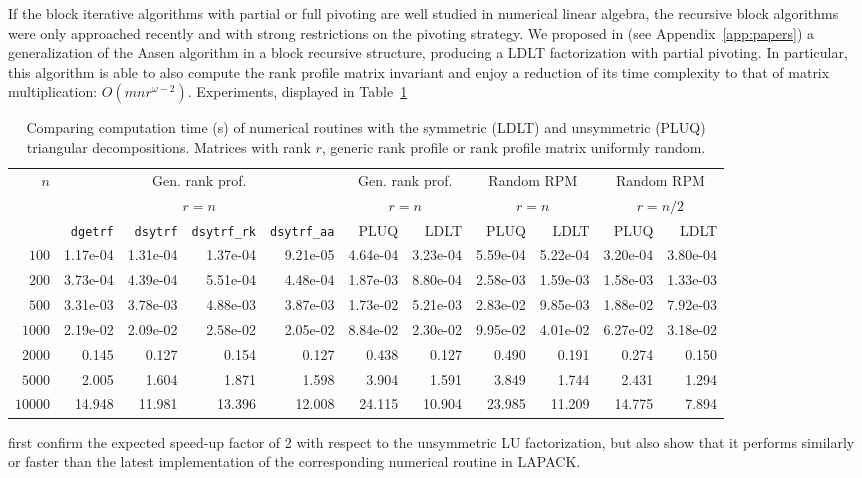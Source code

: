 \documentclass{deliverablereport}
\begin{document}
If the block iterative algorithms with partial or full pivoting are well studied
in numerical linear algebra, the recursive block algorithms were only
approached recently and with strong restrictions on the pivoting strategy.
We proposed in \cite{DuPe18} (see Appendix~\ref{app:papers}) a generalization of the Aasen algorithm in a block
recursive structure, producing a LDLT factorization with partial pivoting. In
particular, this algorithm is able to also compute the rank profile matrix
invariant and enjoy a reduction of its time complexity to that of matrix
multiplication: $O(mnr^{\omega-2})$. Experiments, displayed in
Table~\ref{tab:ldlt}
%
\begin{table}[htb]\centering
  \footnotesize
    \begin{tabular}{rrrrrrrrrrr}
  \toprule
  \multirow{3}{*}{$n$} & 
  \multicolumn{4}{c}{Gen. rank prof.} & \multicolumn{2}{c}{Gen. rank prof.} &
  \multicolumn{2}{c}{Random RPM} & \multicolumn{2}{c}{Random RPM}\\
  &\multicolumn{4}{c}{ $r=n$}&\multicolumn{2}{c}{ $r=n$}&
  \multicolumn{2}{c}{ $r=n$}&\multicolumn{2}{c}{ $r=n/2$}\\
  & \texttt{dgetrf} & \texttt{dsytrf} & \texttt{dsytrf\_rk} & \texttt{dsytrf\_aa} & PLUQ & LDLT & PLUQ& LDLT & PLUQ & LDLT\\
  \midrule
$100$   & 1.17e-04 & 1.31e-04 & 1.37e-04 & 9.21e-05 & 4.64e-04 & 3.23e-04 & 5.59e-04 & 5.22e-04 & 3.20e-04 & 3.80e-04\\
$200$   & 3.73e-04 & 4.39e-04 & 5.51e-04 & 4.48e-04 & 1.87e-03 & 8.80e-04 & 2.58e-03 & 1.59e-03 & 1.58e-03 & 1.33e-03\\
$500$   & 3.31e-03 & 3.78e-03 & 4.88e-03 & 3.87e-03 & 1.73e-02 & 5.21e-03 & 2.83e-02 & 9.85e-03 & 1.88e-02 & 7.92e-03\\
$1000$  & 2.19e-02 & 2.09e-02 & 2.58e-02 & 2.05e-02 & 8.84e-02 & 2.30e-02 & 9.95e-02 & 4.01e-02 & 6.27e-02 & 3.18e-02\\
$2000$  & 0.145 & 0.127 & 0.154 & 0.127 & 0.438 & 0.127 & 0.490 & 0.191 & 0.274 & 0.150\\
$5000$  & 2.005 & 1.604 & 1.871 & 1.598 & 3.904 & 1.591 & 3.849 & 1.744 & 2.431 & 1.294\\
$10000$ & 14.948 & 11.981 & 13.396 & 12.008 & 24.115 & 10.904 & 23.985 & 11.209 & 14.775 & 7.894\\
  \bottomrule 
  \end{tabular}
  \caption{Comparing computation time (s) of numerical routines with the
    symmetric (LDLT) and unsymmetric (PLUQ) triangular decompositions. Matrices
    with rank $r$, generic rank profile or rank profile matrix uniformly
    random. }  
\label{tab:ldlt}
 \end{table}
%
first confirm the expected speed-up factor of 2 with respect
to the unsymmetric LU factorization, but also show that it performs similarly or
faster than the latest implementation of the corresponding numerical routine in LAPACK.
\end{document}
